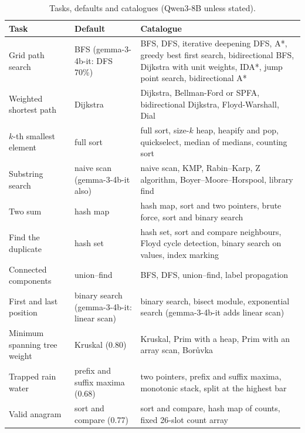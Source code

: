 \documentclass[11pt,letterpaper]{article}
\begin{document}
\begin{table}[!htbp]
\centering
\footnotesize
\caption{Tasks, defaults and catalogues (Qwen3-8B unless stated).}
\label{tab:catalogues}
\begin{tabularx}{\linewidth}{@{}L{3.4cm}L{3.6cm}Y@{}}
\toprule
Task & Default & Catalogue \\
\midrule
Grid path search & BFS (gemma-3-4b-it: DFS 70\%) & BFS, DFS, iterative deepening DFS, A*, greedy best first search, bidirectional BFS, Dijkstra with unit weights, IDA*, jump point search, bidirectional A* \\
Weighted shortest path & Dijkstra & Dijkstra, Bellman-Ford or SPFA, bidirectional Dijkstra, Floyd-Warshall, Dial \\
$k$-th smallest element & full sort & full sort, size-$k$ heap, heapify and pop, quickselect, median of medians, counting sort \\
Substring search & naive scan (gemma-3-4b-it also) & naive scan, KMP, Rabin--Karp, Z algorithm, Boyer--Moore--Horspool, library find \\
Two sum & hash map & hash map, sort and two pointers, brute force, sort and binary search \\
Find the duplicate & hash set & hash set, sort and compare neighbours, Floyd cycle detection, binary search on values, index marking \\
Connected components & union--find & BFS, DFS, union--find, label propagation \\
First and last position & binary search (gemma-3-4b-it: linear scan) & binary search, bisect module, exponential search (gemma-3-4b-it adds linear scan) \\
Minimum spanning tree weight & Kruskal (0.80) & Kruskal, Prim with a heap, Prim with an array scan, Bor\r{u}vka \\
Trapped rain water & prefix and suffix maxima (0.68) & two pointers, prefix and suffix maxima, monotonic stack, split at the highest bar \\
Valid anagram & sort and compare (0.77) & sort and compare, hash map of counts, fixed 26-slot count array \\
\bottomrule
\end{tabularx}
\end{table}
\end{document}
